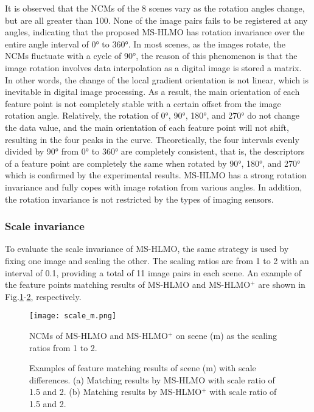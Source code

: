 It is observed that the NCMs of the 8 scenes vary as the rotation angles change, but are all greater than 100. None of the image pairs fails to be registered at any angles, indicating that the proposed MS-HLMO has rotation invariance over the entire angle interval of 0° to 360°. In most scenes, as the images rotate, the NCMs fluctuate with a cycle of 90°, the reason of this phenomenon is that the image rotation involves data interpolation as a digital image is stored a matrix. In other words, the change of the local gradient orientation is not linear, which is inevitable in digital image processing. As a result, the main orientation of each feature point is not completely stable with a certain offset from the image rotation angle. Relatively, the rotation of 0°, 90°, 180°, and 270° do not change the data value, and the main orientation of each feature point will not shift, resulting in the four peaks in the curve. Theoretically, the four intervals evenly divided by 90° from 0° to 360° are completely consistent, that is, the descriptors of a feature point are completely the same when rotated by 90°, 180°, and 270° which is confirmed by the experimental results. MS-HLMO has a strong rotation invariance and fully copes with image rotation from various angles. In addition, the rotation invariance is not restricted by the types of imaging sensors.


\subsubsection{Scale invariance}
To evaluate the scale invariance of MS-HLMO, the same strategy is used by fixing one image and scaling the other. The scaling ratios are from 1 to 2 with an interval of 0.1, providing a total of 11 image pairs in each scene. An example of the feature points matching results of MS-HLMO and MS-HLMO$^+$ are shown in Fig.\ref{fig:scale}-\ref{fig:scale_r}, respectively.

\begin{figure}[h!]
 \begin{center}
  \texttt{[image: scale\_m.png]}
  \caption{NCMs of MS-HLMO and MS-HLMO$^+$ on scene (m) as the scaling ratios from 1 to 2.}
  \label{fig:scale}
 \end{center}
\end{figure}

\begin{figure}[h!]
    \centering
    \hfil
    \caption{Examples of feature matching results of scene (m) with scale differences. (a) Matching results by MS-HLMO with scale ratio of 1.5 and 2. (b) Matching results by MS-HLMO$^+$ with scale ratio of 1.5 and 2.}
    \label{fig:scale_r}
\end{figure}

